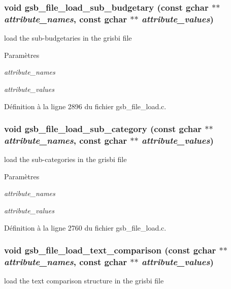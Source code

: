 \subsubsection[{gsb\_\-file\_\-load\_\-sub\_\-budgetary}]{\setlength{\rightskip}{0pt plus 5cm}void gsb\_\-file\_\-load\_\-sub\_\-budgetary (const gchar $\ast$$\ast$ {\em attribute\_\-names}, \/  const gchar $\ast$$\ast$ {\em attribute\_\-values})}\label{gsb__file__load_8c_a709caad01ac9eea898ebca1fb200a8de}
load the sub-\/budgetaries in the grisbi file


\begin{DoxyParams}{Paramètres}
\item[{\em attribute\_\-names}]\item[{\em attribute\_\-values}]\end{DoxyParams}


Définition à la ligne 2896 du fichier gsb\_\-file\_\-load.c.

\subsubsection[{gsb\_\-file\_\-load\_\-sub\_\-category}]{\setlength{\rightskip}{0pt plus 5cm}void gsb\_\-file\_\-load\_\-sub\_\-category (const gchar $\ast$$\ast$ {\em attribute\_\-names}, \/  const gchar $\ast$$\ast$ {\em attribute\_\-values})}\label{gsb__file__load_8c_a9b791438458e7fdace00a67a105d313f}
load the sub-\/categories in the grisbi file


\begin{DoxyParams}{Paramètres}
\item[{\em attribute\_\-names}]\item[{\em attribute\_\-values}]\end{DoxyParams}


Définition à la ligne 2760 du fichier gsb\_\-file\_\-load.c.

\subsubsection[{gsb\_\-file\_\-load\_\-text\_\-comparison}]{\setlength{\rightskip}{0pt plus 5cm}void gsb\_\-file\_\-load\_\-text\_\-comparison (const gchar $\ast$$\ast$ {\em attribute\_\-names}, \/  const gchar $\ast$$\ast$ {\em attribute\_\-values})}\label{gsb__file__load_8c_aa3a2441a09a865cecc43abf1606a4d1d}
load the text comparison structure in the grisbi file


